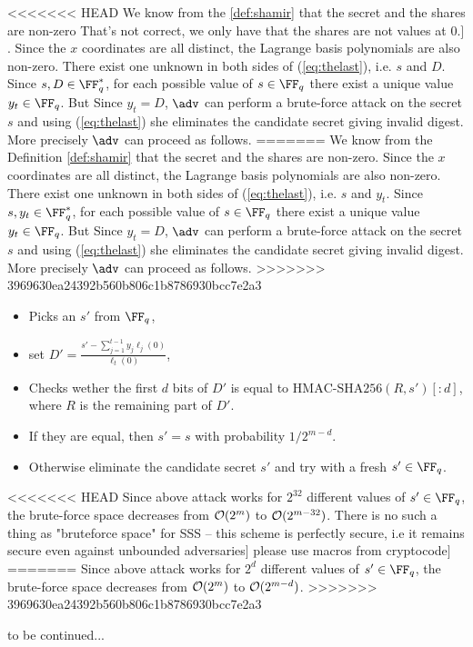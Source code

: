 \documentclass[envcountsame,runningheads,notitlepage]{llncs}
\DeclareRobustCommand{\michals}[2] {{\color{magenta}{$\big[$\scriptsize\textsf{Michal #1:}} #2$\big]$}}
\begin{document}
<<<<<<< HEAD
	We know from the \cref{def:shamir} that the secret and the shares are non-zero \michals{12.03.22}{That's not correct, we only have that the shares are not values at 0.}. Since the $x$ coordinates are all distinct, the Lagrange basis polynomials are also non-zero. There exist one unknown in both sides of (\ref{eq:thelast}), i.e. $s$ and $D$. Since $s,D \in \FF_q^{*}$, for each possible value of $s \in \FF_q$ there exist a unique value $y_{t} \in \FF_q$. But Since $y_{t} = D$, $\adv$ can perform a brute-force attack on the secret $s$ and using (\ref{eq:thelast}) she eliminates the candidate secret giving invalid digest. More precisely $\adv$ can proceed as follows.
=======
	We know from the Definition \ref{def:shamir} that the secret and the shares are non-zero. Since the $x$ coordinates are all distinct, the Lagrange basis polynomials are also non-zero. There exist one unknown in both sides of (\ref{eq:thelast}), i.e. $s$ and $y_{t}$. Since $s, y_{t} \in \FF_q^{*}$, for each possible value of $s \in \FF_q$ there exist a unique value $y_{t} \in \FF_q$. But Since $y_{t} = D$, $\adv$ can perform a brute-force attack on the secret $s$ and using (\ref{eq:thelast}) she eliminates the candidate secret giving invalid digest. More precisely $\adv$ can proceed as follows.
>>>>>>> 3969630ea24392b560b806c1b8786930bcc7e2a3
		\begin{itemize}
			\item Picks an $s'$ from $\FF_q$,
			\item set $D' = \frac{s' - \sum\limits_{j = 1}^{t-1} y_{j}\ell_{j}(0)}{\ell_{t}(0)}$,
			\item Checks wether the first $d$ bits of $D'$ is equal to $\textrm{HMAC-SHA256}(R, s')[:d]$, where $R$ is the remaining part of $D'$.
			\item If they are equal, then $s' = s$ with probability $1/2^{m - d}$. 
			\item Otherwise eliminate the candidate secret $s'$ and try with a fresh $s' \in \FF_q$. 
		\end{itemize}
<<<<<<< HEAD
 Since above attack works for $2^{32}$ different values of $s' \in \FF_q$, the brute-force space decreases from ${\mathcal O}(2^{m})$ to ${\mathcal O}(2^{m-32})$. \michals{13.03}{There is no such a thing as "bruteforce space" for SSS -- this scheme is perfectly secure, i.e it remains secure even against unbounded adversaries}
 \michals{13.03.22}{please use macros from cryptocode}
=======
 Since above attack works for $2^{d}$ different values of $s' \in \FF_q$, the brute-force space decreases from ${\mathcal O}(2^{m})$ to ${\mathcal O}(2^{m - d})$. 
>>>>>>> 3969630ea24392b560b806c1b8786930bcc7e2a3
	
	to be continued...
	
%

\ifnum{}
  
 \else
   
 \fi

\end{document}
